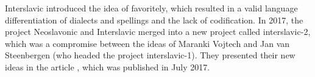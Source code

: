 Interslavic introduced the idea of favoritely, which resulted in a valid language differentiation of dialects and spellings and the lack of codification.  In 2017, the project Neoslavonic and Interslavic merged into a new project called interslavic-2, which was a compromise between the ideas of Maranki Vojtech and Jan van Steenbergen (who headed the project interslavic-1). They presented their new ideas in the article \cite{interslavic-2}, which was published in July 2017.